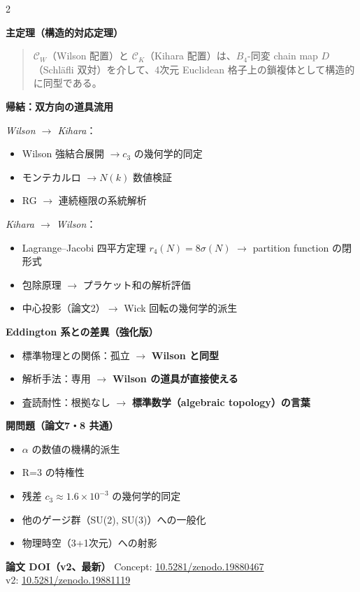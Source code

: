 \documentclass[9pt,a4paper]{ltjsarticle}
\begin{document}
\begin{multicols}{2}
\columnbreak

\textbf{主定理（構造的対応定理）}\enspace
\begin{quote}\footnotesize
$\mathcal{C}_W$（Wilson 配置）と $\mathcal{C}_K$（Kihara 配置）は、$B_4$-同変 chain map $D$（Schl\"afli 双対）を介して、4次元 Euclidean 格子上の鎖複体として構造的に同型である。
\end{quote}

\smallskip
\textbf{帰結：双方向の道具流用}\enspace

\textit{Wilson $\to$ Kihara}：
\begin{itemize}[topsep=1pt]
\item Wilson 強結合展開 $\to c_3$ の幾何学的同定
\item モンテカルロ $\to N(k)$ 数値検証
\item RG $\to$ 連続極限の系統解析
\end{itemize}

\textit{Kihara $\to$ Wilson}：
\begin{itemize}[topsep=1pt]
\item Lagrange--Jacobi 四平方定理 $r_4(N) = 8\sigma(N)$ $\to$ partition function の閉形式
\item 包除原理 $\to$ プラケット和の解析評価
\item 中心投影（論文2）$\to$ Wick 回転の幾何学的派生
\end{itemize}

\smallskip
\textbf{Eddington 系との差異（強化版）}
\begin{itemize}[topsep=1pt]
\item 標準物理との関係：孤立 $\to$ \textbf{Wilson と同型}
\item 解析手法：専用 $\to$ \textbf{Wilson の道具が直接使える}
\item 査読耐性：根拠なし $\to$ \textbf{標準数学（algebraic topology）の言葉}
\end{itemize}

\smallskip
\textbf{開問題（論文7・8 共通）}
\begin{itemize}[topsep=1pt]
\item $\alpha$ の数値の機構的派生
\item R=3 の特権性
\item 残差 $c_3 \approx 1.6\times 10^{-3}$ の幾何学的同定
\item 他のゲージ群（SU(2), SU(3)）への一般化
\item 物理時空（3+1次元）への射影
\end{itemize}

\smallskip
\textbf{論文 DOI（v2、最新）}\enspace
{\scriptsize Concept: \href{https://doi.org/10.5281/zenodo.19880467}{10.5281/zenodo.19880467}\\
v2: \href{https://doi.org/10.5281/zenodo.19881119}{10.5281/zenodo.19881119}}


\end{multicols}
\end{document}
